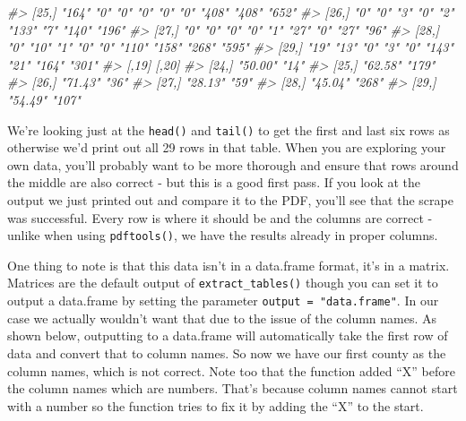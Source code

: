 \documentclass[
]{krantz}
\makeatletter
\newenvironment{Shaded}{\begin{snugshade}}{\end{snugshade}}
\newcommand{\CommentTok}[1]{\textcolor[rgb]{0.37,0.37,0.37}{\textit{#1}}}
\newenvironment{kframe}{%
\medskip{}
\setlength{\fboxsep}{.8em}
 \def\at@end@of@kframe{}%
 \ifinner\ifhmode%
  \def\at@end@of@kframe{\end{minipage}}%
  \begin{minipage}{\columnwidth}%
 \fi\fi%
 \def\FrameCommand##1{\hskip\@totalleftmargin \hskip-\fboxsep
 \colorbox{shadecolor}{##1}\hskip-\fboxsep
     \hskip-\linewidth \hskip-\@totalleftmargin \hskip\columnwidth}%
 \MakeFramed {\advance\hsize-\width
   \@totalleftmargin\z@ \linewidth\hsize
   \@setminipage}}%
 {\par\unskip\endMakeFramed%
 \at@end@of@kframe}
\renewenvironment{Shaded}{\begin{kframe}}{\end{kframe}}
\makeatother
\begin{document}
\begin{Shaded}
\begin{Highlighting}[]
\CommentTok{\#\textgreater{} [25,] "164" "0"   "0"   "0"   "0"   "0"   "408" "408" "652"}
\CommentTok{\#\textgreater{} [26,] "0"   "0"   "3"   "0"   "2"   "133" "7"   "140" "196"}
\CommentTok{\#\textgreater{} [27,] "0"   "0"   "0"   "0"   "1"   "27"  "0"   "27"  "96" }
\CommentTok{\#\textgreater{} [28,] "0"   "10"  "1"   "0"   "0"   "110" "158" "268" "595"}
\CommentTok{\#\textgreater{} [29,] "19"  "13"  "0"   "3"   "0"   "143" "21"  "164" "301"}
\CommentTok{\#\textgreater{}       [,19]   [,20]}
\CommentTok{\#\textgreater{} [24,] "50.00" "14" }
\CommentTok{\#\textgreater{} [25,] "62.58" "179"}
\CommentTok{\#\textgreater{} [26,] "71.43" "36" }
\CommentTok{\#\textgreater{} [27,] "28.13" "59" }
\CommentTok{\#\textgreater{} [28,] "45.04" "268"}
\CommentTok{\#\textgreater{} [29,] "54.49" "107"}
\end{Highlighting}
\end{Shaded}

We're looking just at the \texttt{head()} and
\texttt{tail()} to get the first and last six rows as
otherwise we'd print out all 29 rows in that table. When you
are exploring your own data, you'll probably want to be more
thorough and ensure that rows around the middle are also
correct - but this is a good first pass. If you look at the
output we just printed out and compare it to the PDF, you'll
see that the scrape was successful. Every row is where it
should be and the columns are correct - unlike when using
\texttt{pdftools()}, we have the results already in proper
columns.

One thing to note is that this data isn't in a data.frame
format, it's in a matrix. Matrices are the default output of
\texttt{extract\_tables()} though you can set it to output a
data.frame by setting the parameter
\texttt{output\ =\ "data.frame"}. In our case we actually
wouldn't want that due to the issue of the column names. As
shown below, outputting to a data.frame will automatically
take the first row of data and convert that to column names.
So now we have our first county as the column names, which
is not correct. Note too that the function added ``X''
before the column names which are numbers. That's because
column names cannot start with a number so the function
tries to fix it by adding the ``X'' to the start.
\end{document}
